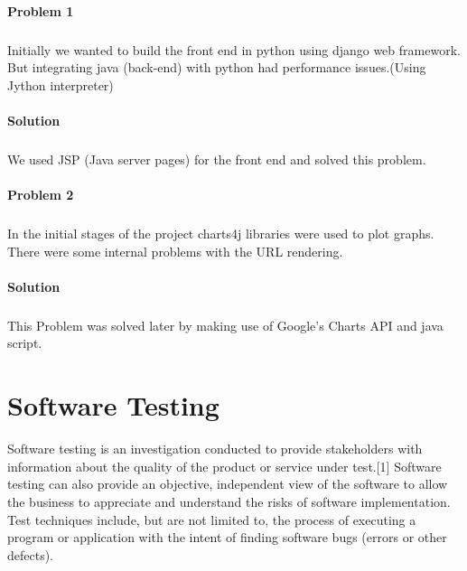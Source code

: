 \documentclass[12pt]{report}
\begin{document}
\subsubsection{Problem 1}
\paragraph{}Initially we wanted to build the front end in python using django web framework. But integrating java (back-end) with python had performance issues.(Using Jython interpreter)
\subsubsection{Solution}
\paragraph{}We used JSP (Java server pages) for the front end and solved this problem.
\subsubsection{Problem 2}
\paragraph{}In the initial stages of the project charts4j libraries were used to plot graphs. There were some internal problems with the URL rendering.

\subsubsection{Solution}
\paragraph{}This Problem was solved later by making use of Google's Charts API and java script. 


\pagebreak






\pagestyle{fancy}
\chead{}
\rfoot{\small{\thepage}}
\renewcommand{\headrulewidth}{0.4pt}
\renewcommand{\footrulewidth}{0.4pt}
\chapter{Software Testing}
Software testing is an investigation conducted to provide stakeholders with information about the quality of the product or service under test.[1] Software testing can also provide an objective, independent view of the software to allow the business to appreciate and understand the risks of software implementation. Test techniques include, but are not limited to, the process of executing a program or application with the intent of finding software bugs (errors or other defects).
\end{document}
